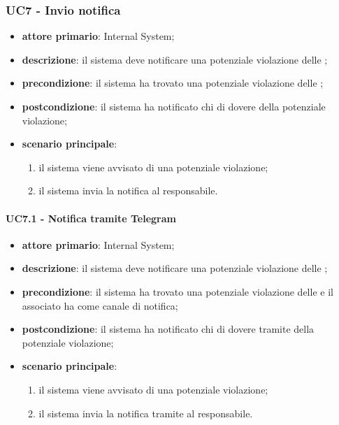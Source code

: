 \subsubsection{UC7 - Invio notifica}
\begin{itemize}
	\item \textbf{attore primario}: Internal System;
	\item \textbf{descrizione}: il sistema deve notificare una potenziale violazione delle ;
	\item \textbf{precondizione}: il sistema ha trovato una potenziale violazione delle ;
	\item \textbf{postcondizione}: il sistema ha notificato chi di dovere della potenziale violazione;
	\item \textbf{scenario principale}: 
	\begin{enumerate}
		\item il sistema viene avvisato di una potenziale violazione;
		\item il sistema invia la notifica al responsabile.
	\end{enumerate}
\end{itemize}
\paragraph{UC7.1 -  Notifica tramite Telegram}
\begin{itemize}
	\item \textbf{attore primario}: Internal System;
	\item \textbf{descrizione}: il sistema deve notificare una potenziale violazione delle ;
	\item \textbf{precondizione}: il sistema ha trovato una potenziale violazione delle  e il  associato ha  come canale di notifica;
	\item \textbf{postcondizione}: il sistema ha notificato chi di dovere tramite   della potenziale violazione;
	\item \textbf{scenario principale}: 
	\begin{enumerate}
		\item il sistema viene avvisato di una potenziale violazione;
		\item il sistema invia la notifica tramite  al responsabile.
	\end{enumerate}
\end{itemize}
